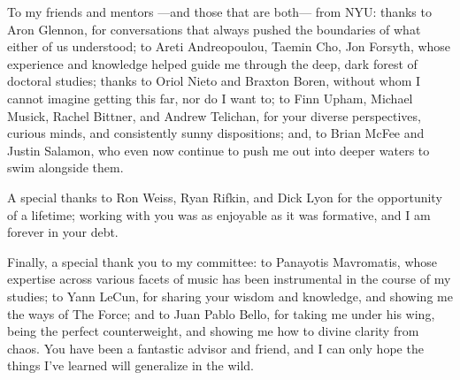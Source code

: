 To my friends and mentors ---and those that are both--- from NYU:
thanks to Aron Glennon, for conversations that always pushed the boundaries of what either of us understood;
to Areti Andreopoulou, Taemin Cho, Jon Forsyth, whose experience and knowledge helped guide me through the deep, dark forest of doctoral studies;
thanks to Oriol Nieto and Braxton Boren, without whom I cannot imagine getting this far, nor do I want to;
to Finn Upham, Michael Musick, Rachel Bittner, and Andrew Telichan, for your diverse perspectives, curious minds, and consistently sunny dispositions;
and, to Brian McFee and Justin Salamon, who even now continue to push me out into deeper waters to swim alongside them.

A special thanks to Ron Weiss, Ryan Rifkin, and Dick Lyon for the opportunity of a lifetime;
working with you was as enjoyable as it was formative, and I am forever in your debt.

Finally, a special thank you to my committee:
to Panayotis Mavromatis, whose expertise across various facets of music has been instrumental in the course of my studies;
to Yann LeCun, for sharing your wisdom and knowledge, and showing me the ways of The Force;
and to Juan Pablo Bello, for taking me under his wing, being the perfect counterweight, and showing me how to divine clarity from chaos.
You have been a fantastic advisor and friend, and I can only hope the things I've learned will generalize in the wild.


